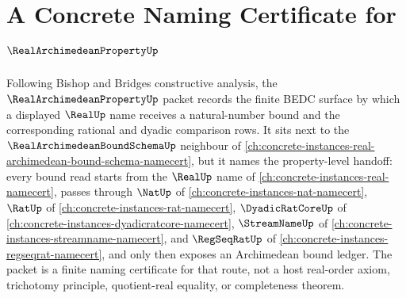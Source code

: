 \chapter{A Concrete Naming Certificate for $\RealArchimedeanPropertyUp$}
\label{ch:concrete-instances-real-archimedean-property-namecert}

Following Bishop and Bridges constructive analysis, the $\RealArchimedeanPropertyUp$ packet records the finite BEDC surface by which a displayed $\RealUp$ name receives a natural-number bound and the corresponding rational and dyadic comparison rows. It sits next to the $\RealArchimedeanBoundSchemaUp$ neighbour of \autoref{ch:concrete-instances-real-archimedean-bound-schema-namecert}, but it names the property-level handoff: every bound read starts from the $\RealUp$ name of \autoref{ch:concrete-instances-real-namecert}, passes through $\NatUp$ of \autoref{ch:concrete-instances-nat-namecert}, $\RatUp$ of \autoref{ch:concrete-instances-rat-namecert}, $\DyadicRatCoreUp$ of \autoref{ch:concrete-instances-dyadicratcore-namecert}, $\StreamNameUp$ of \autoref{ch:concrete-instances-streamname-namecert}, and $\RegSeqRatUp$ of \autoref{ch:concrete-instances-regseqrat-namecert}, and only then exposes an Archimedean bound ledger. The packet is a finite naming certificate for that route, not a host real-order axiom, trichotomy principle, quotient-real equality, or completeness theorem.

